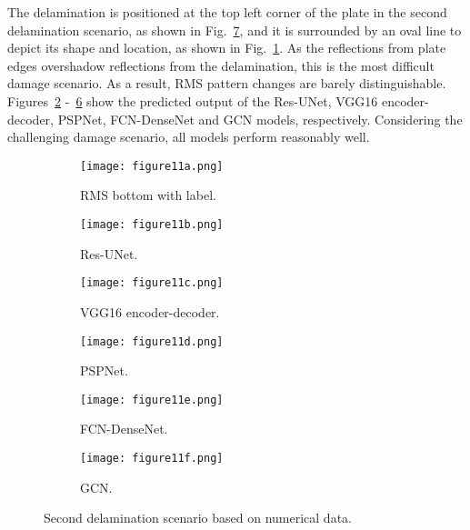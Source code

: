 The delamination is positioned at the top left corner of the plate in the second delamination scenario, as shown in Fig.~\ref{fig:385_softmax}, and it is surrounded by an oval line to depict its shape and location, as shown in Fig.~\ref{fig:RMS_flat_shell_Vz_385}.
As the reflections from plate edges overshadow reflections from the delamination, this is the most difficult damage scenario.
As a result, RMS pattern changes are barely distinguishable.
Figures~\ref{fig:Unet_Pred__softmax_385} -~\ref{fig:gcn_pred_385} show the predicted output of the Res-UNet, VGG16 encoder-decoder, PSPNet, FCN-DenseNet and GCN models, respectively.
Considering the challenging damage scenario, all models perform reasonably well.
\begin{figure}[!h]
	\centering
	\begin{subfigure}[b]{0.47\textwidth}
		\centering
		\texttt{[image: figure11a.png]}
		\caption{RMS bottom with label.}
		\label{fig:RMS_flat_shell_Vz_385}
	\end{subfigure}
	\hfill
	\begin{subfigure}[b]{0.47\textwidth}
		\centering
		\texttt{[image: figure11b.png]}
		\caption{Res-UNet.}
		\label{fig:Unet_Pred__softmax_385}
	\end{subfigure}
	\hfill
	\begin{subfigure}[b]{0.47\textwidth}
		\centering
		\texttt{[image: figure11c.png]}
		\caption{VGG16 encoder-decoder.}			\label{fig:vgg16_pred__softmax_385}			
	\end{subfigure}
	\hfill
	\begin{subfigure}[b]{0.47\textwidth}
		\centering
		\texttt{[image: figure11d.png]}
		\caption{PSPNet.}
		\label{fig:pspnet_pred__softmax_385}
	\end{subfigure}	
	\hfill
	\begin{subfigure}[b]{0.47\textwidth}
		\centering
		\texttt{[image: figure11e.png]}
		\caption{FCN-DenseNet.}
		\label{fig:fcn_densenet_pred__softmax_385}
	\end{subfigure}	
	\hfill
	\begin{subfigure}[b]{0.47\textwidth}
		\centering
		\texttt{[image: figure11f.png]}
		\caption{GCN.}
		\label{fig:gcn_pred_385}
	\end{subfigure}
	\caption{Second delamination scenario based on numerical data.}
	\label{fig:385_softmax}
\end{figure}
\clearpage

